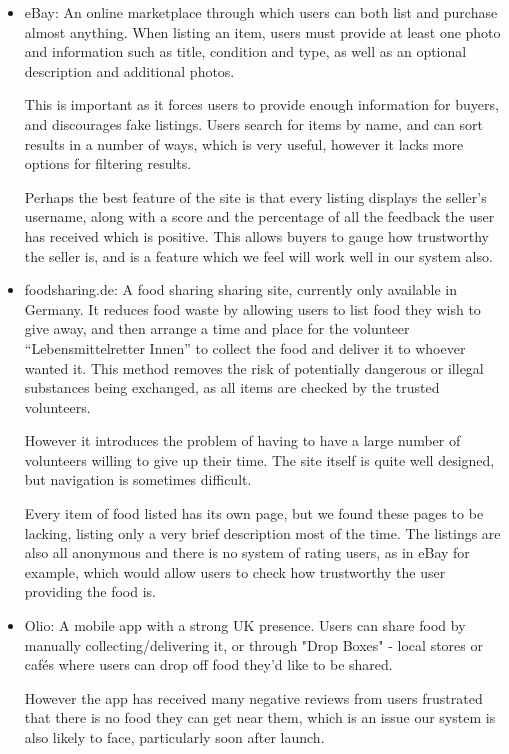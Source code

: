 \documentclass[12pt]{article}
\begin{document}
\begin{itemize}

    \item eBay: An online marketplace through which users can both list and
        purchase almost anything. When listing an item, users must provide at
        least one photo and information such as title, condition and type, as
        well as an optional description and additional photos.

        This is important as it forces users to provide enough information
        for buyers, and discourages fake listings.
        Users search for items by name, and can sort results in a number of
        ways, which is very useful, however it lacks more options for filtering
        results.
        
        Perhaps the best feature of the site is that every listing displays
        the seller’s username, along with a score and the percentage of all
        the feedback the user has received which is positive.
        This allows buyers to gauge how trustworthy the seller is, and is a
        feature which we feel will work well in our system also.


    \item foodsharing.de: A food sharing sharing site, currently only available
        in Germany.
        It reduces food waste by allowing users to list food they wish to give
        away, and then arrange a time and place for the volunteer
        “Lebensmittelretter Innen” to collect the food and deliver it to
        whoever wanted it.
        This method removes the risk of potentially dangerous or illegal
        substances being exchanged, as all items are checked by the trusted
        volunteers.
        
        However it introduces the problem of having to have a large number of
        volunteers willing to give up their time. The site itself is quite well
        designed, but navigation is sometimes difficult.

        Every item of food listed has its own page, but we found these pages to
        be lacking, listing only a very brief description most of the time.
        The listings are also all anonymous and there is no system of rating
        users, as in eBay for example, which would allow users to check how
        trustworthy the user providing the food is.
    
    \item Olio: A mobile app with a strong UK presence.
        Users can share food by manually collecting/delivering it, or through
        "Drop Boxes" - local stores or cafés where users can drop off food
        they'd like to be shared.
        
        However the app has received many negative reviews from users frustrated
        that there is no food they can get near them, which is an issue our
        system is also likely to face, particularly soon after launch.

\end{itemize}
\end{document}
